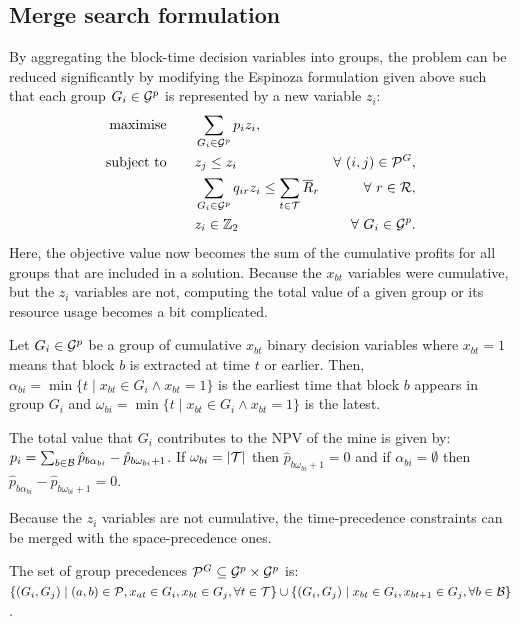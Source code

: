 \documentclass[journal]{IEEEtran}
\begin{document}
\subsection*{Merge search formulation}

By aggregating the block-time decision variables into groups, the problem can be reduced significantly by modifying the Espinoza formulation given above such that each group $G_i \in \S{G}^p$ is represented by a new variable $z_i$: 
{\footnotesize
\begin{align}
\Max \qquad & \displaystyle\sum_{G_i \in \S{G}^p} p_{i}z_i,\label{eq:cpit_merge}\\
\ST \qquad & z_j \leq z_i \qquad \qquad & \forall\ (i,j) \in \mathcal{P}^G, \nonumber\\
& \displaystyle\sum_{G_i \in \S{G}^p}q_{ir}z_i \leq \displaystyle\sum_{t \in \S{T}}\overline{R}_{r} & \forall\ r \in \S{R}, \nonumber\\
& z_i \in \Bin & \forall\ G_i \in \S{G}^p \nonumber.
\end{align}
}
Here, the objective value now becomes the sum of the cumulative profits for all groups that are included in a solution. Because the $x_{bt}$ variables were cumulative, but the $z_i$ variables are not, computing the total value of a given group or its resource usage becomes a bit complicated.

\begin{definition}
Let $G_i \in \S{G}^p$ be a group of cumulative \(x_{bt}\) binary decision variables where \(x_{bt} = 1\) means that block $b$ is extracted at time $t$ or earlier. Then, \(\alpha_{bi} = \min\{t \mid x_{bt} \in G_i \land x_{bt} = 1\}\) is the earliest time that block \(b\) appears in group \(G_i\) and \(\omega_{bi} = \min\{t \mid x_{bt} \in G_i \land x_{bt} = 1\}\) is the latest.
\end{definition}

\begin{prop}\label{prop:merge-group-profit}
The total value that $G_i$ contributes to the NPV of the mine is given by: $p_i = \sum_{b \in \S{B}} \hat{p}_{b\alpha_{bi}} - \hat{p}_{b\omega_{bi}+1}$. If $\omega_{bi} = |\S{T}|$ then $\hat{p}_{b\omega_{bi}+1} = 0$ and if \(\alpha_{bi} = \emptyset\) then \(\hat{p}_{b\alpha_{bi}} - \hat{p}_{b\omega_{bi}+1} = 0\).
\end{prop}
%
Because the $z_i$ variables are not cumulative, the time-precedence constraints can be merged with the space-precedence ones. 
\begin{prop}\label{prop:merge-group-prec}
The set of group precedences $\mathcal{P}^G \subseteq \S{G}^p \times \S{G}^p$ is: $\{(G_i,G_j) \mid (a,b) \in \mathcal{P}, x_{at} \in G_i, x_{bt} \in G_j, \forall t \in \S{T}\} \cup \{(G_i,G_j) \mid x_{bt} \in G_i, x_{bt+1} \in G_j, \forall b \in \S{B}\}$.
\end{prop}
\end{document}
